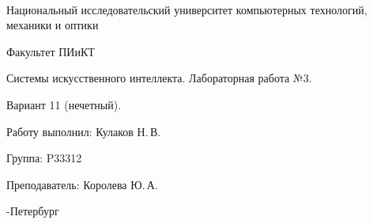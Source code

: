 \thispagestyle{empty}

\onecolumn
\begin{center}
	\
\vspace{1 cm}

\huge Национальный исследовательский университет компьютерных технологий, механики и оптики
\vspace{0.5cm}

\Huge Факультет ПИиКТ


\vspace{5cm}
\huge Системы искусственного интеллекта. Лабораторная работа №3.
\vspace{0.2cm}

\LARGE Вариант 11 (нечетный).
\end{center}
\vspace{6 cm}

\begin{flushright}
\Large

Работу выполнил: Кулаков Н.\,В.
\smallskip

Группа: P33312
\smallskip

Преподаватель: Королева Ю.\,А.
\smallskip

\vspace{4cm}
	
-Петербург

\end{flushright}
